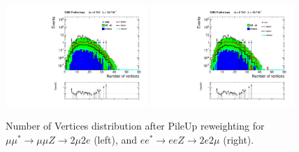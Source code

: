 
\begin{figure}[hp]
\begin{center}
\includegraphics[width=0.48\textwidth]{plot/VtxN_2mu2e.pdf}
\includegraphics[width=0.48\textwidth]{plot/VtxN_2e2mu.pdf}
\end{center} 
\caption{\label{fig:Vertices}Number of Vertices distribution after PileUp reweighting for $\mu\mu^{*} \rightarrow \mu\mu Z \rightarrow 2\mu2e$ (left), and $ee^{*} \rightarrow ee Z \rightarrow 2e2\mu$ (right).}
\end{figure}  
